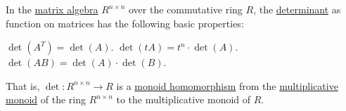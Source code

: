 \begin{proposition}\label{thm:def:matrix_determinant}
  In the \hyperref[thm:matrix_algebra]{matrix algebra} \( R^{n \times n} \) over the commutative ring \( R \), the \hyperref[def:matrix_determinant]{determinant} as function on matrices has the following basic properties:
  \begin{thmenum}
     \( \det(A^T) = \det(A) \).
     \( \det(tA) = t^n \cdot \det(A) \).
     \( \det(AB) = \det(A) \cdot \det(B) \).

    That is, \( \det: R^{n \times n} \to R \) is a \hyperref[def:monoid/homomorphism]{monoid homomorphism} from the \hyperref[def:semiring]{multiplicative monoid} of the ring \( R^{n \times n} \) to the multiplicative monoid of \( R \).
  \end{thmenum}
\end{proposition}

